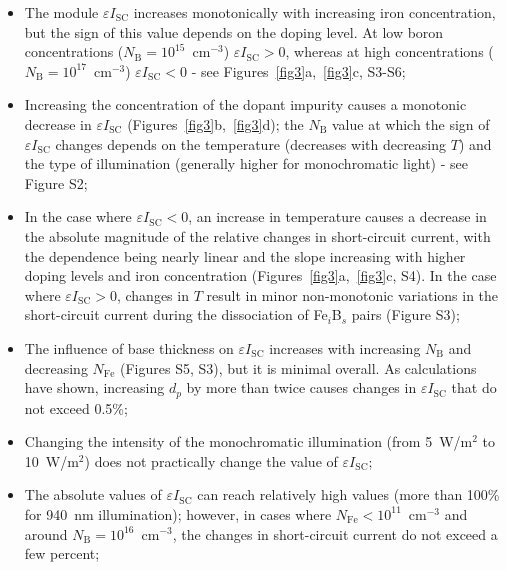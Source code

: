 \documentclass[a4paper,fleqn]{cas-sc}
\begin{document}
\begin{itemize}
    \item The module $\varepsilon I_\mathrm{SC}$ increases monotonically with increasing iron concentration, but the sign of this value depends on the doping level. At low boron concentrations ($N_\mathrm{B}=10^{15}$~cm$^{-3}$) $\varepsilon I_\mathrm{SC} > 0$, whereas at high concentrations ($N_\mathrm{B}=10^{17}$~cm$^{-3}$) $\varepsilon I_\mathrm{SC} < 0$ - see Figures~\ref{fig3}a,~\ref{fig3}c, S3-S6;
    \item Increasing the concentration of the dopant impurity causes a monotonic decrease in $\varepsilon I_\mathrm{SC}$ (Figures~\ref{fig3}b,~\ref{fig3}d); the $N_\mathrm{B}$ value at which the sign of $\varepsilon I_\mathrm{SC}$ changes depends on the temperature (decreases with decreasing $T$) and the type of illumination (generally higher for monochromatic light) - see Figure S2;
    \item In the case where $\varepsilon I_\mathrm{SC} < 0$, an increase in temperature causes a decrease in the absolute magnitude of the relative changes in short-circuit current, with the dependence being nearly linear and the slope increasing with higher doping levels and iron concentration (Figures~\ref{fig3}a,~\ref{fig3}c, S4). In the case where $\varepsilon I_\mathrm{SC} > 0$, changes in $T$ result in minor non-monotonic variations in the short-circuit current during the dissociation of Fe$_i$B$_s$ pairs (Figure S3);
    \item The influence of base thickness on $\varepsilon I_\mathrm{SC}$ increases with increasing $N_\mathrm{B}$ and decreasing $N_\mathrm{Fe}$ (Figures S5, S3), but it is minimal overall. As calculations have shown, increasing $d_p$ by more than twice causes changes in $\varepsilon I_\mathrm{SC}$ that do not exceed 0.5\%;
    \item Changing the intensity of the monochromatic illumination (from 5~W/m$^{2}$ to 10~W/m$^{2}$) does not practically change the value of $\varepsilon I_\mathrm{SC}$;
    \item The absolute values of $\varepsilon I_\mathrm{SC}$ can reach relatively high values (more than 100\% for 940~nm illumination); however, in cases where $N_\mathrm{Fe}<10^{11}$~cm$^{-3}$ and around $N_\mathrm{B}=10^{16}$~cm$^{-3}$, the changes in short-circuit current do not exceed a few percent;
\end{itemize}
\end{document}
